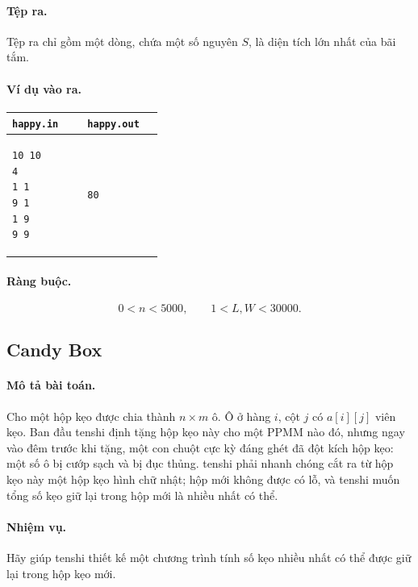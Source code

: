 \documentclass[11pt]{article}
\begin{document}
\paragraph{Tệp ra.}
Tệp ra chỉ gồm một dòng, chứa một số nguyên \(S\), là diện tích lớn nhất của
bãi tắm.

\paragraph{Ví dụ vào ra.}
\begin{center}
\begin{tabular}{p{0.42\linewidth}|p{0.42\linewidth}}
\texttt{happy.in} & \texttt{happy.out} \\
\hline
\begin{verbatim}
10 10
4
1 1
9 1
1 9
9 9
\end{verbatim}
&
\begin{verbatim}
80
\end{verbatim}
\end{tabular}
\end{center}

\paragraph{Ràng buộc.}
\[
  0<n<5000,\qquad 1<L,W<30000.
\]

\subsection{Candy Box}

\paragraph{Mô tả bài toán.}
Cho một hộp kẹo được chia thành \(n\times m\) ô. Ô ở hàng \(i\), cột \(j\) có
\(a[i][j]\) viên kẹo. Ban đầu tenshi định tặng hộp kẹo này cho một PPMM nào
đó, nhưng ngay vào đêm trước khi tặng, một con chuột cực kỳ đáng ghét đã đột
kích hộp kẹo: một số ô bị cướp sạch và bị đục thủng. tenshi phải nhanh chóng
cắt ra từ hộp kẹo này một hộp kẹo hình chữ nhật; hộp mới không được có lỗ, và
tenshi muốn tổng số kẹo giữ lại trong hộp mới là nhiều nhất có thể.

\paragraph{Nhiệm vụ.}
Hãy giúp tenshi thiết kế một chương trình tính số kẹo nhiều nhất có thể được
giữ lại trong hộp kẹo mới.
\end{document}
